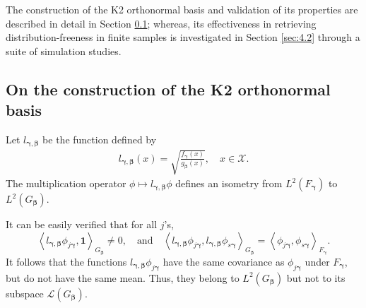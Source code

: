 \documentclass[11pt]{article}
\newcommand{\vect}[1]{\boldsymbol{#1}}
\newcommand{\inner}[1]{\left\langle #1 \right\rangle}
\newcommand{\phj}{\phi_{j\vect{\gamma}}}
\newcommand{\phs}{\phi_{s\vect{\gamma}}}
\begin{document}
The construction of the K2 orthonormal basis and validation of its properties are described in detail in Section \ref{sec:4.1}; whereas, its effectiveness in retrieving distribution-freeness in finite samples is investigated in Section \ref{sec:4.2} through a suite of simulation studies. 

\subsection{On the construction of the K2 orthonormal basis}\label{sec:4.1}

Let $l_{\vect{\gamma},\vect{\beta}}$ be the function defined by
\begin{equation*}
\begin{aligned}
l_{\vect{\gamma},\vect{\beta}}(x)= \sqrt{\frac{ f_{\vect{\gamma}}(x)}{g_{\vect{\beta}}(x)}}, \quad x\in\mathcal{X}.
\label{eqn:isometry}
\end{aligned}
\end{equation*}
The multiplication operator $\phi\mapsto l_{\vect{\gamma},\vect{\beta}}\phi$ defines an isometry from
$L^2(F_{\vect{\gamma}})$ to $L^2(G_{\vect{\beta}})$. 

It can be easily verified that for all $j$'s,
\begin{equation*} 
\inner{l_{\vect{\gamma},\vect{\beta}} \phj,\vect{1}}_{{G_{\vect{\beta}}}}\neq 0, \quad \text{and} \quad \inner{l_{\vect{\gamma},\vect{\beta}}\phj,l_{\vect{\gamma},\vect{\beta}}\phs}_{{G_{\vect{\beta}}}}=\inner{\phj,\phs}_{{F_{\vect{\gamma}}}}.
\end{equation*}
It follows that the functions $l_{\vect{\gamma},\vect{\beta}}\phj$ have the same covariance as $\phj$ under $F_{\vect{\gamma}}$, but do not have the same mean. Thus, they belong to $L^2(G_{\vect{\beta}})$ but not to its subspace $\mathcal{L}(G_{\vect{\beta}})$.  
\end{document}
